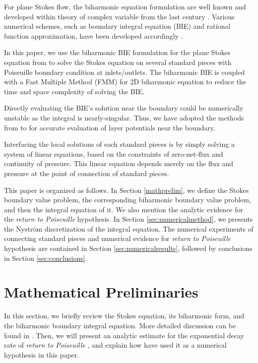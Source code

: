 \documentclass[10pt,twocolumn]{article}
\begin{document}
For plane Stokes flow, the biharmonic equation formulation are well known 
and developed within theory of complex variable from the last century \cite{ladyzhenskayaMathematicalTheoryViscous1964}. 
Various numerical schemes, such as boundary integral equation (BIE) and rational function approximation, 
have been developed accordingly \cite{greengardIntegralEquationMethods1996,trefethenApproximationTheoryApproximation2019}. 

In this paper, we use the biharmonic BIE formulation for the plane Stokes equation from 
\cite{greengardIntegralEquationMethods1996} to solve the Stokes equation on several standard pieces 
with Poiseuille boundary condition at inlets/outlets. 
The biharmonic BIE is coupled with a Fast Multiple Method (FMM) for 2D biharmonic equation
to reduce the time and space complexity of solving the BIE. \cite{FlatironinstituteFmm2d2022} 

Directly evaluating the BIE's solution near the boundary could be numerically unstable as the integral is nearly-singular.
Thus, we have adopted the methods from 
\cite{wuSolutionStokesFlow2020,helsingEvaluationLayerPotentials2008} 
to for accurate evaluation of layer potentials near the boundary. 

Interfacing the local solutions of each standard pieces is by 
simply solving a system of linear equations, 
based on the constraints of zero-net-flux and continuity of pressure. 
This linear equation depends merely on the flux and pressure at the
point of connection of standard pieces.  

This paper is organized as follows. In Section \ref{mathprelim}, we define the Stokes boundary value problem, 
the corresponding biharmonic boundary value problem, and then the integral equation of it. 
We also mention the analytic evidence for the \textit{return to Poiseuille} hypothesis. 
In Section \ref{sec:numericalmethod}, we presents the Nystr\"om discretization
of the integral equation. 
The numerical experiments of connecting standard pieces and numerical evidence for \textit{return to Poiseuille}
hypothesis are contained in Section \ref{sec:numericalresults}, 
followed by conclusions in Section \ref{sec:conclusions}.

\section{Mathematical Preliminaries\label{mathprelim}}

In this section, we briefly review the Stokes equation, its biharmonic form,
and the biharmonic boundary integral equation. More detailed discussion can be found in \cite{greengardIntegralEquationMethods1996}. 
Then, we will present an analytic estimate for the exponential decay rate of 
\textit{return to Poiseuille} \cite{gregoryTractionBoundaryValue1980}, and explain how have 
used it as a numerical hypothesis in this paper.
\end{document}
